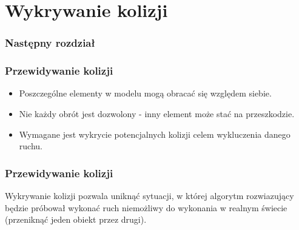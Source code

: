 \documentclass{beamer}
\begin{document}
    \section{Wykrywanie kolizji}
    \begin{frame}
        \frametitle{Następny rozdział}
        \tableofcontents[currentsection]
    \end{frame}
    \begin{frame}
    	\frametitle{Przewidywanie kolizji}
        \begin{itemize}
            \item Poszczególne elementy w modelu mogą obracać się względem siebie.
            \item Nie każdy obrót jest dozwolony - inny element może stać na przeszkodzie.
            \item Wymagane jest wykrycie potencjalnych kolizji celem wykluczenia danego ruchu.
        \end{itemize}
    \end{frame}
    \begin{frame}
    	\frametitle{Przewidywanie kolizji}
        	Wykrywanie kolizji pozwala uniknąć sytuacji, w której algorytm rozwiazujący będzie
        	próbował wykonać ruch niemożliwy do wykonania w realnym świecie (przeniknąć jeden obiekt
       		przez drugi).
    \end{frame}
\end{document}
